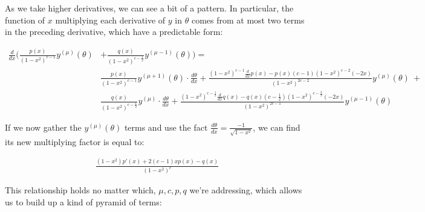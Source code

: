 \documentclass[10pt]{article}
\begin{document}
As we take higher derivatives, we can see a bit of a pattern. In particular, the function of $x$ multiplying each derivative of $y$ in $\theta$ comes from at most two terms in the preceding derivative, which have a predictable form:

\begin{align*}
\frac{d}{dx} \Big( \frac{p(x)}{(1-x^2)^{c-1}} y^{(\mu)}(\theta) &+ \frac{q(x)}{(1-x^2)^{c -\frac{1}{2}}} y^{(\mu-1)}(\theta) \Big) = \\
&\frac{p(x)}{(1-x^2)^{c-1}} y^{(\mu+1)}(\theta) \cdot \frac{d\theta}{dx} + \frac{(1 - x^2)^{c-1} \frac{d}{dx} p(x) - p(x)(c-1)(1-x^2)^{c-2}(-2x)}{(1-x^2)^{2c - 2}} y^{(\mu)}(\theta)\ +\\
&\frac{q(x)}{(1-x^2)^{c-\frac{1}{2}}} y^{(\mu)} \cdot \frac{d\theta}{dx} + \frac{(1 - x^2)^{c-\frac{1}{2}} \frac{d}{dx} q(x) - q(x)(c-\frac{1}{2})(1-x^2)^{c-\frac{3}{2}}(-2x)}{(1-x^2)^{2c - 1}} y^{(\mu-1)}(\theta)
\end{align*} 

If we now gather the $y^{(\mu)}(\theta)$ terms and use the fact $\frac{d\theta}{dx} = \frac{-1}{\sqrt{1-x^2}}$, we can find its new multiplying factor is equal to:

\begin{align*}
\frac{(1-x^2)p'(x) + 2(c-1)xp(x) - q(x)}{(1 - x^2)^c}
\end{align*}

This relationship holds no matter which, $\mu, c, p, q$ we're addressing, which allows us to build up a kind of pyramid of terms:
\end{document}
